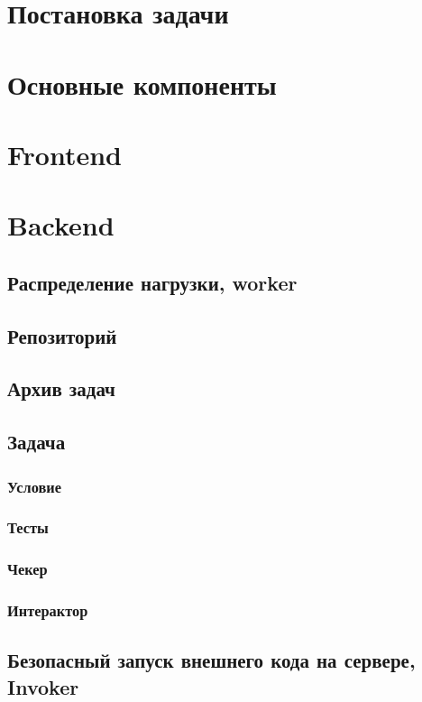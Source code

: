\chapter{Постановка задачи}

\chapter{Основные компоненты}

\chapter{Frontend}

\chapter{Backend}

\section{Распределение нагрузки, worker}

\section{Репозиторий}

\section{Архив задач}

\section{Задача}

\subsection{}

\subsection{Условие}

\subsection{Тесты}

\subsection{Чекер}

\subsection{Интерактор}

\section{Безопасный запуск внешнего кода на сервере, Invoker}
